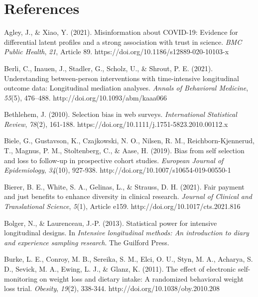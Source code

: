 \documentclass[authordate, empirical]{jote-new-article}
\begin{document}
	\section{\textbf{References}}



	Agley, J., \& Xiao, Y. (2021). Misinformation about COVID-19: Evidence for differential latent profiles and a strong association with trust in science. \emph{BMC Public Health},\emph{ 21}, Article 89. https://doi.org/10.1186/s12889-020-10103-x



	Berli, C., Inauen, J., Stadler, G., Scholz, U., \& Shrout, P. E. (2021). Understanding between-person interventions with time-intensive longitudinal outcome data: Longitudinal mediation analyses. \emph{Annals of Behavioral Medicine},\emph{ 55}(5), 476--488. http://doi.org/10.1093/abm/kaaa066



	Bethlehem, J. (2010). Selection bias in web surveys. \emph{International Statistical Review},\emph{ 78}(2), 161-188. https://doi.org/10.1111/j.1751-5823.2010.00112.x



	Biele, G., Gustavson, K., Czajkowski, N. O., Nilsen, R. M., Reichborn-Kjennerud, T., Magnus, P. M., Stoltenberg, C., \& Aase, H. (2019). Bias from self selection and loss to follow-up in prospective cohort studies. \emph{European Journal of Epidemiology},\emph{ 34}(10), 927-938. http://doi.org/10.1007/s10654-019-00550-1



	Bierer, B. E., White, S. A., Gelinas, L., \& Strauss, D. H. (2021). Fair payment and just benefits to enhance diversity in clinical research. \emph{Journal of Clinical and Translational Science},\emph{ 5}(1), Article e159. http://doi.org/10.1017/cts.2021.816



	Bolger, N., \& Laurenceau, J.-P. (2013). Statistical power for intensive longitudinal designs. In \emph{Intensive longitudinal methods: An introduction to diary and experience sampling research}. The Guilford Press.



	Burke, L. E., Conroy, M. B., Sereika, S. M., Elci, O. U., Styn, M. A., Acharya, S. D., Sevick, M. A., Ewing, L. J., \& Glanz, K. (2011). The effect of electronic self-monitoring on weight loss and dietary intake: A randomized behavioral weight loss trial. \emph{Obesity},\emph{ 19}(2), 338-344. http://doi.org/10.1038/oby.2010.208
\end{document}
